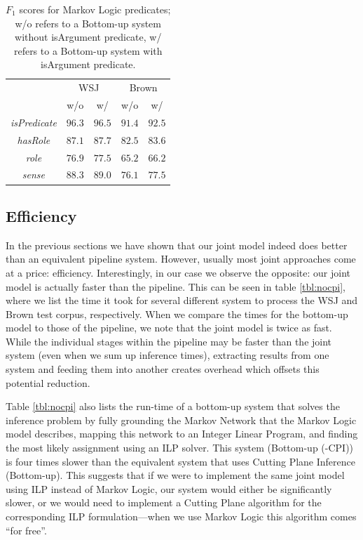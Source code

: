 \begin{table}[ht]

    \centering
    \begin{tabular}{|c|c|c|c|c|}\hline
      & \multicolumn{2}{c|}{WSJ} & \multicolumn{2}{c|}{Brown}\\
                                  & w/o     & w/     & w/o    & w/  \\\hline 
        \emph{isPredicate}        & $96.3$  & $96.5$ & $91.4$ & $92.5$\\
        \emph{hasRole}            & $87.1$  & $87.7$ & $82.5$ & $83.6$ \\
        \emph{role}               & $76.9$  & $77.5$ & $65.2$ & $66.2$ \\
        \emph{sense}              & $88.3$  & $89.0$ & $76.1$ & $77.5$ \\\hline
    \end{tabular}
    \caption{$F_1$ scores for Markov Logic predicates; w/o refers to a Bottom-up system without isArgument predicate, w/ refers to a Bottom-up system with isArgument predicate.}
    \label{tbl:isArg}
\end{table}

\subsection{Efficiency}
In the previous sections we have shown that our joint model indeed does better than an equivalent pipeline system. However, usually most joint approaches come at a price: efficiency. Interestingly, in our case we observe the opposite: our joint model is actually faster than the pipeline. This can be seen in table \ref{tbl:nocpi}, where we list the time it took for several different system to process the WSJ and Brown test corpus, respectively. When we compare the times for the bottom-up model to those of the pipeline, we note that the joint model is twice as fast. While the individual stages within the pipeline may be faster than the joint system (even when we sum up inference times), extracting results from one system and feeding them into another creates overhead which offsets this potential reduction.  

Table \ref{tbl:nocpi} also lists the run-time of a bottom-up system that solves the inference problem by fully grounding the Markov Network that the Markov Logic model describes, mapping this network to an Integer Linear Program, and finding the most likely assignment using an ILP solver. This system (Bottom-up (-CPI)) is four times slower than the equivalent system that uses Cutting Plane Inference  (Bottom-up). This suggests that if we were to implement the same joint model using ILP instead of Markov Logic, our system would either be significantly slower, or we would need to implement a Cutting Plane algorithm for the corresponding ILP formulation---when we use Markov Logic this algorithm comes ``for free''. 

